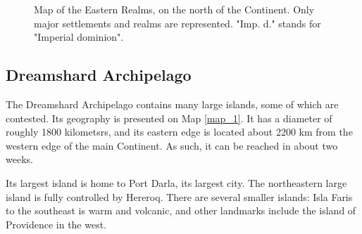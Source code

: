 \begin{figure}[ht!]
    \centering
    \caption{Map of the Eastern Realms, on the north of the Continent. Only major settlements and realms are represented. "Imp. d." stands for "Imperial dominion".}
    \label{map_2}
\end{figure}




\subsection{Dreamshard Archipelago}

The Dreamshard Archipelago contains many large islands, some of which are contested. Its geography is presented on Map \ref{map_1}. It has a diameter of roughly 1800 kilometsrs, and its eastern edge is located about 2200 km from the western edge of the main Continent. As such, it can be reached in about two weeks.

Its largest island is home to Port Darla, its largest city. The northeastern large island is fully controlled by Hereroq. There are several smaller islands: Isla Faris to the southeast is warm and volcanic, and other landmarks include the island of Providence in the west.
       
